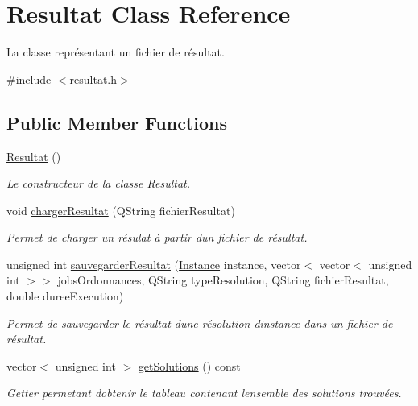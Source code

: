 \hypertarget{classResultat}{}\section{Resultat Class Reference}
\label{classResultat}


La classe représentant un fichier de résultat.  




{\ttfamily \#include $<$resultat.\+h$>$}

\subsection*{Public Member Functions}
\begin{DoxyCompactItemize}
\item 
\hyperlink{classResultat_acc2413409ddb57b3d1ac405d8bdfb922}{Resultat} ()
\begin{DoxyCompactList}\small\item\em Le constructeur de la classe \hyperlink{classResultat}{Resultat}. \end{DoxyCompactList}\item 
void \hyperlink{classResultat_afce37c00573db2aa3f96dd5d69f50d40}{charger\+Resultat} (Q\+String fichier\+Resultat)
\begin{DoxyCompactList}\small\item\em Permet de charger un résulat à partir d\textquotesingle{}un fichier de résultat. \end{DoxyCompactList}\item 
unsigned int \hyperlink{classResultat_adc6f1595c1e2271cd39805a6b62e8448}{sauvegarder\+Resultat} (\hyperlink{classInstance}{Instance} instance, vector$<$ vector$<$ unsigned int $>$$>$ jobs\+Ordonnances, Q\+String type\+Resolution, Q\+String fichier\+Resultat, double duree\+Execution)
\begin{DoxyCompactList}\small\item\em Permet de sauvegarder le résultat d\textquotesingle{}une résolution d\textquotesingle{}instance dans un fichier de résultat. \end{DoxyCompactList}\item 
vector$<$ unsigned int $>$ \hyperlink{classResultat_ac1b23e9ca052ec68a71f7d028673404c}{get\+Solutions} () const
\begin{DoxyCompactList}\small\item\em Getter permetant d\textquotesingle{}obtenir le tableau contenant l\textquotesingle{}ensemble des solutions trouvées. \end{DoxyCompactList}\item 
$$
\end{DoxyCompactItemize}
